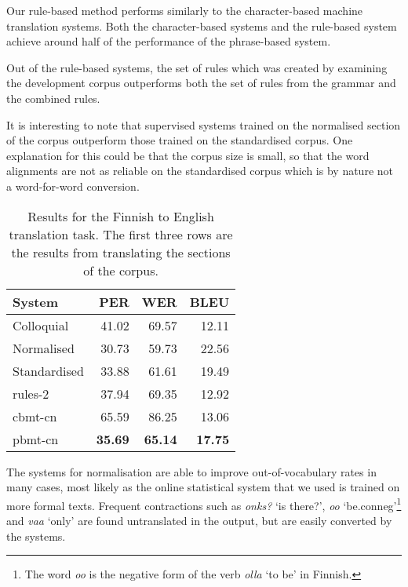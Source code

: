 \documentclass[11pt]{article}
\begin{document}
Our rule-based method performs similarly to the character-based machine translation systems. Both 
the character-based systems and the rule-based system achieve around half of the performance of the phrase-based system.

Out of the rule-based systems, the set of rules which was created by examining the development corpus
outperforms both the set of rules from the grammar and the combined rules.

It is interesting to note that supervised systems trained on the normalised section of the corpus outperform
those trained on the standardised corpus. One explanation for this could be that the corpus size is small, so 
that the word alignments are not as reliable on the standardised corpus which is by nature not a word-for-word 
conversion.

\begin{table}
  \centering
  \begin{tabular}{|l|r|r|r|}
     \hline
    \textbf{System} & \textbf{PER} & \textbf{WER} & \textbf{BLEU} \\
     \hline
     Colloquial &  41.02  &  69.57  & 12.11 \\
     Normalised &  30.73  &  59.73  & 22.56 \\
     Standardised &  33.88  &  61.61  & 19.49 \\
     \hline
     rules-2 &  37.94  &  69.35  & 12.92 \\
     \hline
     {\sc cbmt}-cn &  65.59  &  86.25  & 13.06 \\
     {\sc pbmt}-cn &  \textbf{35.69}  &  \textbf{65.14}  & \textbf{17.75} \\
     \hline
  \end{tabular}
  \caption{Results for the Finnish to English translation task. The first three rows are the results 
    from translating the sections of the corpus.}
  \label{table:results-trad}
\end{table}

The systems for normalisation are able to improve out-of-vocabulary rates in 
many cases, most likely as the online statistical system that we used is trained
on more formal texts. Frequent contractions such as \emph{onks?} `is there?',
\emph{oo} `be.{\sc conneg}'\footnote{The word \emph{oo} is the negative form of the verb \emph{olla} `to be' in Finnish.} and \emph{vaa} `only' are found untranslated in the output, but 
are easily converted by the systems.

\end{document}
